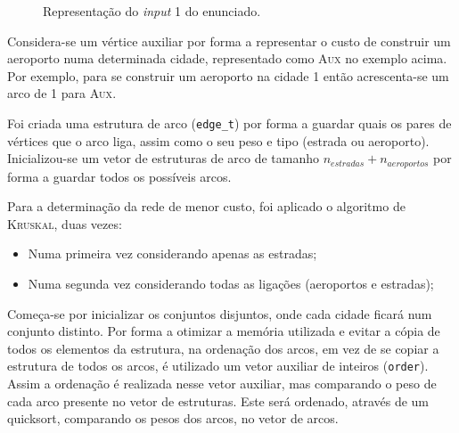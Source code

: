 \documentclass[12pt]{article}
\begin{document}
\begin{figure}[h]
\centering
{}
\caption{Representação do \textit{input} 1 do enunciado.}
\end{figure}
Considera-se um vértice auxiliar por forma a representar o custo de construir um aeroporto numa determinada cidade, representado como \textsc{Aux} no exemplo acima. Por exemplo, para se construir um aeroporto na cidade 1 então acrescenta-se um arco de 1 para \textsc{Aux}.

Foi criada uma estrutura de arco (\texttt{edge\_t}) por forma a guardar quais os pares de vértices que o arco liga, assim como o seu peso e tipo (estrada ou aeroporto). Inicializou-se um vetor de estruturas de arco de tamanho $ n_{estradas} + n_{aeroportos} $ por forma a guardar todos os possíveis arcos.

Para a determinação da rede de menor custo, foi aplicado o algoritmo de \textsc{Kruskal}, duas vezes:
\begin{itemize}
	\item Numa primeira vez considerando apenas as estradas;
	\item Numa segunda vez considerando todas as ligações (aeroportos e estradas);
\end{itemize}

Começa-se por inicializar os conjuntos disjuntos, onde cada cidade ficará num conjunto distinto.
Por forma a otimizar a memória utilizada e evitar a cópia de todos os elementos da estrutura, na ordenação dos arcos, em vez de se copiar a estrutura de todos os arcos, é utilizado um vetor auxiliar de inteiros (\texttt{order}). Assim a ordenação é realizada nesse vetor auxiliar, mas comparando o peso de cada arco presente no vetor de estruturas.
Este será ordenado, através de um quicksort, comparando os pesos dos arcos, no vetor de arcos.
\end{document}
